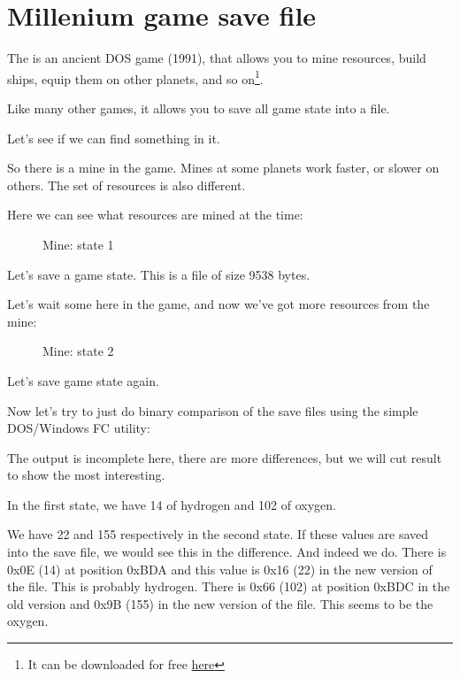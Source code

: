 ﻿\section{Millenium game save file}
\label{Millenium_DOS_game}

The  
is an ancient DOS game (1991), that allows you to mine resources, build ships,
equip them on other planets, and so on\footnote{It can be downloaded for free
\href{http://go.yurichev.com/17316}{here}}.

Like many other games, it allows you to save all game state into a file.

Let's see if we can find something in it.

\clearpage
So there is a mine in the game.
Mines at some planets 
work faster, or slower on others. 
The set of resources is also different.

Here we can see what resources are mined at the time: 

\begin{figure}[H]
\centering
{}
\caption{Mine: state 1}
\label{fig:mill_1}
\end{figure}

Let's save a game state.
This is a file of size 9538 bytes.

Let's wait some  here in the game, and now we've got more resources from the mine:

\begin{figure}[H]
\centering
{}
\caption{Mine: state 2}
\label{fig:mill_2}
\end{figure}

Let's save game state again.

Now let's try to just do binary comparison of the save files using the simple DOS/Windows FC utility:



The output is incomplete here, there are more differences, but we will cut result to show the most interesting.

In the first state, we have 14  of hydrogen and 102  of oxygen.

We have 22 and 155  respectively in the second state.
If these values are saved into 
the save file, we would see this in the difference.
And indeed we do. 
There is 0x0E (14) at position 0xBDA and this value is 
0x16 (22) in the new version of the file.
This is probably hydrogen.
There is 0x66 (102) at position 0xBDC in the old 
version and 0x9B (155) in the new version of the file. 
This seems to be the oxygen.

